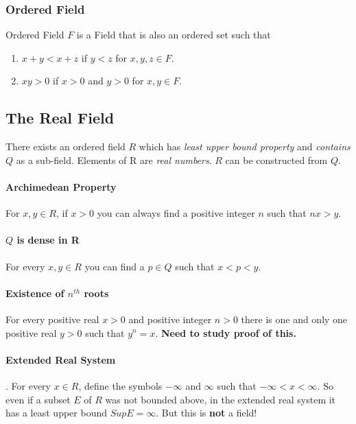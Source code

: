 \documentclass{article}
\begin{document}
	  \subsubsection{Ordered Field}
	  Ordered Field $F$ is a Field that is also an ordered set such that 
	  \begin{enumerate}
	  	\item $x + y < x + z$ if $y < z$ for $x,y,z \in F$.
	  	\item $xy > 0$ if $x > 0$ and $y > 0$ for $x,y \in F$.
	  \end{enumerate}
	 
	\subsection{The Real Field}
	There exists an ordered field $R$ which has \emph{least upper bound property} and \emph{contains $Q$} as a sub-field. Elements of R are \emph{real numbers}.
	$R$ can be constructed from $Q$.
	
	\paragraph{Archimedean Property} For $x,y \in R$, if $x > 0$ you can always find a positive integer $n$ such that $nx > y$.
	\paragraph{$Q$ is dense in R} For every $x,y \in R$ you can find a $p \in Q$ such that $x < p < y$.
	\paragraph{Existence of $n^{th}$ roots} For every positive real $x > 0$ and positive integer $n > 0$ there is one and only one positive real $y > 0$ such that $y^n = x$. \textbf{Need to study proof of this.}
	\paragraph{Extended Real System}. For every $x \in R$, define the symbols $-\infty$ and $\infty$ such that $-\infty < x < \infty$. So even if a subset  $E$ of $R$ was not bounded above, in the extended real system it has a least upper bound $Sup E = \infty$. But this is \textbf{not} a field!
	
\end{document}
